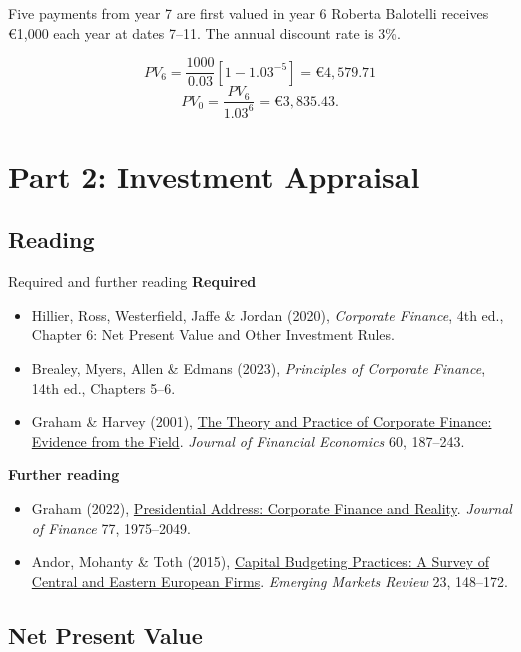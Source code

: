 \documentclass[9pt,aspectratio=169]{beamer}
\begin{document}
\begin{frame}{Five payments from year 7 are first valued in year 6}
Roberta Balotelli receives €1,000 each year at dates 7--11. The annual discount rate is 3\%.
\begin{center}\end{center}
\[
PV_6=\frac{1000}{0.03}\left[1-1.03^{-5}\right]=\text{€}4,579.71
\]
\[
PV_0=\frac{PV_6}{1.03^6}=\boxed{\text{€}3,835.43}.
\]
\end{frame}

\section[Part 2: Investment Appraisal]{\textbf{Part 2: Investment Appraisal}}

\subsection{Reading}

\begin{frame}{Required and further reading}
\textbf{Required}
\begin{itemize}
\item Hillier, Ross, Westerfield, Jaffe \& Jordan (2020), \textit{Corporate Finance}, 4th ed., Chapter 6: Net Present Value and Other Investment Rules.
\item Brealey, Myers, Allen \& Edmans (2023), \textit{Principles of Corporate Finance}, 14th ed., Chapters 5--6.
\item Graham \& Harvey (2001), \href{https://doi.org/10.1016/S0304-405X(01)00044-7}{The Theory and Practice of Corporate Finance: Evidence from the Field}. \textit{Journal of Financial Economics} 60, 187--243.
\end{itemize}
\textbf{Further reading}
\begin{itemize}
\item Graham (2022), \href{https://doi.org/10.1111/jofi.13161}{Presidential Address: Corporate Finance and Reality}. \textit{Journal of Finance} 77, 1975--2049.
\item Andor, Mohanty \& Toth (2015), \href{https://doi.org/10.1016/j.ememar.2015.04.002}{Capital Budgeting Practices: A Survey of Central and Eastern European Firms}. \textit{Emerging Markets Review} 23, 148--172.
\end{itemize}
\end{frame}

\subsection{Net Present Value}
\end{document}
